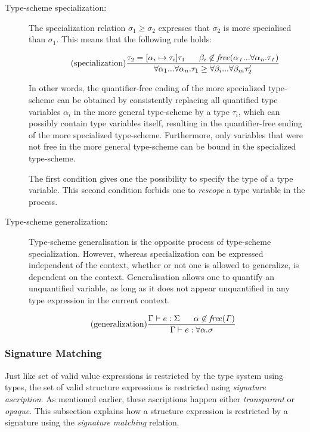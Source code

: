 \begin{description}
\item[Type-scheme specialization:]
The specialization relation $\sigma_{1} \geq \sigma_{2}$ expresses that $\sigma_{2}$ is more specialised than $\sigma_{1}$. This means that the following rule holds:
%

\[
\tag{specialization}
\frac{\tau_{2}=[\alpha_{i} \mapsto \tau_{i}]\tau_{1} \;\;\;\;\;\; \beta_{i} \not\in\mathit{free(\alpha_{1}...\forall \alpha_{n}.\tau_{1})}}
{\forall\alpha_{1}...\forall\alpha_{n}.\tau_{1}\geq \forall \beta_{i}...\forall \beta_{m}\tau_{2}'}
\]

In other words, the quantifier-free ending of the more specialized type-scheme can be obtained by consistently replacing all quantified type variables $\alpha_{i}$ in the more general type-scheme by a type $\tau_{i}$, which can possibly contain type variables itself, resulting in the quantifier-free ending of the more specialized type-scheme. Furthermore, only variables that were not free in the more general type-scheme can be bound in the specialized type-scheme.

The first condition gives one the possibility to specify the type of a type variable. This second condition forbids one to \emph{rescope} a type variable in the process.

\item[Type-scheme generalization:]
Type-scheme generalisation is the opposite process of type-scheme specialization. However, whereas specialization can be expressed independent of the context, whether or not one is allowed to generalize, is dependent on the context. Generalisation allows one to quantify an unquantified variable, as long as it does not appear unquantified in any type expression in the current context.
\end{description}

\[
\tag{generalization}
\frac{\Gamma \vdash e:\Sigma \;\;\;\;\;\; \alpha \not\in \mathit{free(\Gamma)}}{\Gamma \vdash e : \forall \alpha . \sigma}
\]

\subsubsection{Signature Matching}
\label{sec:StructuralTyping}
Just like set of valid value expressions  is restricted by the type system using types, the set of valid structure expressions is restricted using \emph{signature ascription}. As mentioned earlier, these ascriptions happen either \emph{transparant} or \emph{opaque}.
This subsection explains how a structure expression is restricted by a signature using the \emph{signature matching} relation.

